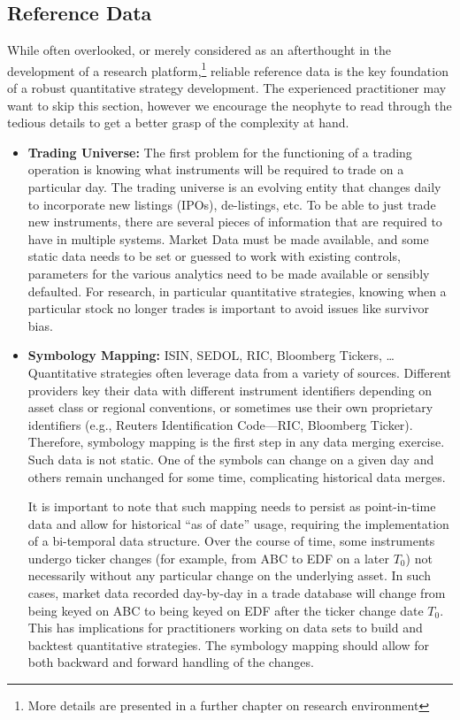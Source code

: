 \subsection{Reference Data\label{sec:reference_data}} 

While often overlooked, or merely considered as an afterthought in the development of a research platform,\footnote{More details are presented in a further chapter on research environment} reliable reference data is the key foundation of a robust quantitative strategy development. The experienced practitioner may want to skip this section, however we encourage the neophyte to read through the tedious details to get a better grasp of the complexity at hand.


\begin{itemize}
\item \textbf{Trading Universe:} The first problem for the functioning of a trading operation is knowing what instruments will be required to trade on a particular day. The trading universe is an evolving entity that changes daily to incorporate new listings (IPOs), de-listings, etc. To be able to just trade new instruments, there are several pieces of information that are required to have in multiple systems. Market Data must be made available, and some static data needs to be set or guessed to work with existing controls, parameters for the various analytics need to be made available or sensibly defaulted. For research, in particular quantitative strategies, knowing when a particular stock no longer trades is important to avoid issues like survivor bias.
 
\item \textbf{Symbology Mapping:} ISIN, SEDOL, RIC, Bloomberg Tickers, \dots 
Quantitative strategies often leverage data from a variety of sources. Different providers key their data with different instrument identifiers depending on asset class or regional conventions, or sometimes use their own proprietary identifiers (e.g., Reuters Identification Code---RIC, Bloomberg Ticker). Therefore, symbology mapping is the first step in any data merging exercise. Such data is not static. One of the symbols can change on a given day and others remain unchanged for some time, complicating historical data merges.


It is important to note that such mapping needs to persist as point-in-time data and allow for historical ``as of date'' usage, requiring the implementation of a bi-temporal data structure. Over the course of time, some instruments undergo ticker changes (for example, from ABC to EDF on a later $T_0$) not necessarily without any particular change on the underlying asset. In such cases, market data recorded day-by-day in a trade database will change from being keyed on ABC to being keyed on EDF after the ticker change date $T_0$. This has implications for practitioners working on data sets to build and backtest quantitative strategies. The symbology mapping should allow for both backward and forward handling of the changes.



\end{itemize}

